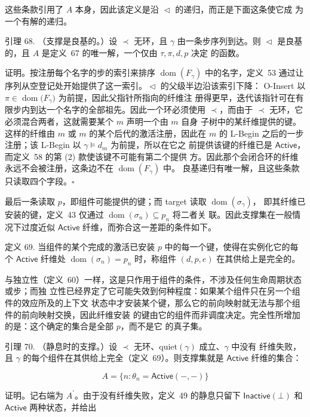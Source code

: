 \documentclass[
  10
]{article}
\begin{document}
这些条款引用了 \(A\) 本身，因此该定义是沿 \(\vartriangleleft\) 的递归，而正是下面这条使它成
为一个有解的递归。

引理 68. （支撑是良基的。）设 \(\prec\) 无环，且 \(\gamma\) 由一条步序列到达。则
\(\vartriangleleft\) 是良基的，且 \(A\) 是定义~67 的唯一解，一个仅由 \(\tau, \pi, d, p\) 决定
的函数。

证明。按注册每个名字的步的索引来排序 \(\operatorname{dom}(F_{\gamma})\) 中的名字，定义~53
通过让序列从空登记处开始提供了这一索引。\(\vartriangleleft\) 的父级半边沿该索引下降：
O-Insert 以 \(\pi \in \operatorname{dom}\big(F_{\gamma}\big)\) 为前提，因此父指针所指向的纤维注
册得更早，迭代该指针可在有限步内到达一个名字的全部祖先。因此一个环必须使用
\(\prec\)，而由于 \(\prec\) 无环，它必须混合两者，这就需要某个 \(m\) 声明一个由 \(m\) 自身
子树中的某纤维提供的键。这样的纤维由 \(m\) 或 \(m\) 的某个后代的激活注册，因此在
\(m\) 的 L-Begin 之后的一步注册；该 L-Begin 以 \(\gamma \models d_{m}\) 为前提，所以在它之
前提供该键的纤维已是 \(\mathsf{Active}\)，而定义~58 的第 (2) 款使该键不可能有第二个提供
方。因此那个会闭合环的纤维永远不会被注册，这条边不在 \(\operatorname{dom}(F_{\gamma})\) 中。
良基递归有唯一解，且这些条款只读取四个字段。\(\square\)

最后一条读取 \(p\)，即组件可能提供的键；而 target 读取 \(\operatorname{dom}(\sigma_{\gamma})\)，
即其纤维已安装的键，定义~43 仅通过 \(\operatorname{dom}(\sigma_{n}) \subseteq p_{n}\) 将二者关
联。因此支撑集在一般情况下过度近似 \(\mathsf{Active}\) 纤维，而弥合这一差距的条件如下。

定义 69. 当组件的某个完成的激活已安装 \(p\) 中的每一个键，使得在实例化它的每个
\(\mathsf{Active}\) 纤维处 \(\operatorname{dom}(\sigma_{n}) = p_{n}\) 时，称组件 \((d, p, e)\)
在其供给上是完全的。

与独立性（定义~60）一样，这是只作用于组件的条件，不涉及任何生命周期状态或步；而独
立性已经界定了它可能失效到何种程度：如果某个组件只在另一个组件的效应所及的上下文
状态中才安装某个键，那么它的前向映射就无法与那个组件的前向映射交换，因此纤维安装
的键由它的组件而非调度决定。完全性所增加的是：这个确定的集合是全部 \(p\)，而不是它
的真子集。

引理 70. （静息时的支撑。）设 \(\prec\) 无环、\(\mathrm{quiet}(\gamma)\) 成立、\(\gamma\) 中没有
纤维失败，且 \(\gamma\) 的每个组件在其供给上完全（定义~69）。则支撑集就是
\(\mathsf{Active}\) 纤维的集合：

\[
A = \{ n : \theta_{n} = \mathsf{Active}(-,-) \} \tag{64}
\]

证明。记右端为 \(A^{\prime}\)。由于没有纤维失败，定义~49 的静息只留下
\(\mathsf{Inactive}(\bot)\) 和 \(\mathsf{Active}\) 两种状态，并给出
\end{document}
